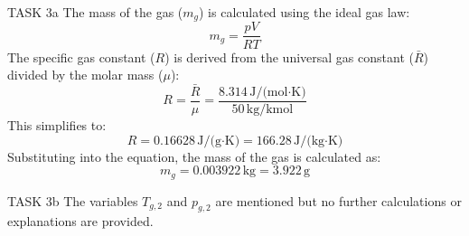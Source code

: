 TASK 3a  
The mass of the gas (\( m_g \)) is calculated using the ideal gas law:  
\[
m_g = \frac{p V}{R T}
\]  
The specific gas constant (\( R \)) is derived from the universal gas constant (\( \bar{R} \)) divided by the molar mass (\( \mu \)):  
\[
R = \frac{\bar{R}}{\mu} = \frac{8.314 \, \text{J/(mol·K)}}{50 \, \text{kg/kmol}}
\]  
This simplifies to:  
\[
R = 0.16628 \, \text{J/(g·K)} = 166.28 \, \text{J/(kg·K)}
\]  
Substituting into the equation, the mass of the gas is calculated as:  
\[
m_g = 0.003922 \, \text{kg} = 3.922 \, \text{g}
\]  

TASK 3b  
The variables \( T_{g,2} \) and \( p_{g,2} \) are mentioned but no further calculations or explanations are provided.